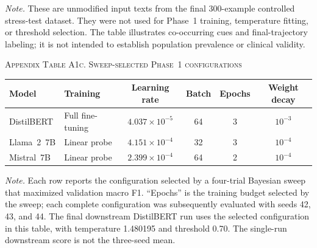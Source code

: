 \documentclass{ieeeaccess}
\begin{document}
\noindent\footnotesize\textit{Note.} These are unmodified input texts from the final 300-example controlled stress-test dataset. They were not used for Phase~1 training, temperature fitting, or threshold selection. The table illustrates co-occurring cues and final-trajectory labeling; it is not intended to establish population prevalence or clinical validity.\normalsize
\par\medskip

\noindent\textsc{Appendix Table A1c. Sweep-selected Phase~1 configurations}\par
\label{tab:appendix-a1c-phase1-configurations}
\smallskip
\footnotesize
\setlength{\tabcolsep}{5pt}
\renewcommand{\arraystretch}{1.14}
\noindent\begin{tabularx}{\textwidth}{@{}>{\raggedright\arraybackslash}p{}>{\raggedright\arraybackslash}Y c c c c@{}}
\toprule
Model & Training & Learning rate & Batch & Epochs & Weight decay \\
\midrule
DistilBERT & Full fine-tuning & $4.037\times10^{-5}$ & 64 & 3 & $10^{-3}$ \\
Llama~2~7B & Linear probe & $4.151\times10^{-4}$ & 32 & 3 & $10^{-4}$ \\
Mistral~7B & Linear probe & $2.399\times10^{-4}$ & 64 & 2 & $10^{-4}$ \\
\bottomrule
\end{tabularx}
\par\smallskip
\normalsize

\noindent\footnotesize\textit{Note.} Each row reports the configuration selected by a four-trial Bayesian sweep that maximized validation macro F1. ``Epochs'' is the training budget selected by the sweep; each complete configuration was subsequently evaluated with seeds 42, 43, and 44. The final downstream DistilBERT run uses the selected configuration in this table, with temperature 1.480195 and threshold 0.70. The single-run downstream score is not the three-seed mean.\normalsize
\par\medskip
\end{document}
